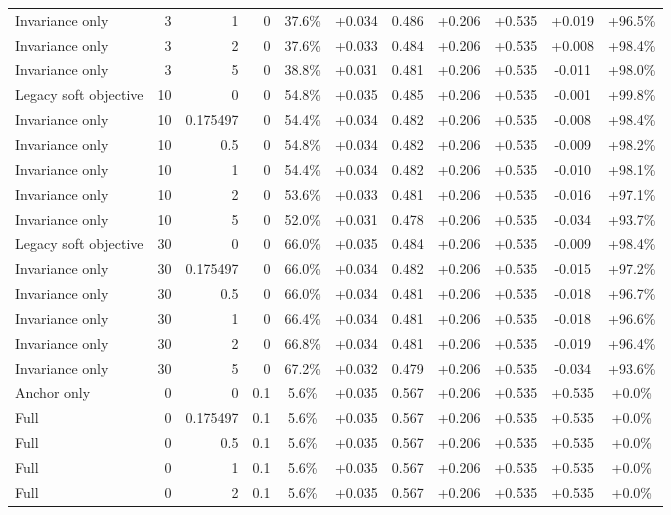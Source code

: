 \begin{table}[htbp]
\begin{tabular}{lrrrccccccc}
Invariance only & 3 & 1 & 0 & 37.6\% & +0.034 & 0.486 & +0.206 & +0.535 & +0.019 & +96.5\% \\
Invariance only & 3 & 2 & 0 & 37.6\% & +0.033 & 0.484 & +0.206 & +0.535 & +0.008 & +98.4\% \\
Invariance only & 3 & 5 & 0 & 38.8\% & +0.031 & 0.481 & +0.206 & +0.535 & -0.011 & +98.0\% \\
Legacy soft objective & 10 & 0 & 0 & 54.8\% & +0.035 & 0.485 & +0.206 & +0.535 & -0.001 & +99.8\% \\
Invariance only & 10 & 0.175497 & 0 & 54.4\% & +0.034 & 0.482 & +0.206 & +0.535 & -0.008 & +98.4\% \\
Invariance only & 10 & 0.5 & 0 & 54.8\% & +0.034 & 0.482 & +0.206 & +0.535 & -0.009 & +98.2\% \\
Invariance only & 10 & 1 & 0 & 54.4\% & +0.034 & 0.482 & +0.206 & +0.535 & -0.010 & +98.1\% \\
Invariance only & 10 & 2 & 0 & 53.6\% & +0.033 & 0.481 & +0.206 & +0.535 & -0.016 & +97.1\% \\
Invariance only & 10 & 5 & 0 & 52.0\% & +0.031 & 0.478 & +0.206 & +0.535 & -0.034 & +93.7\% \\
Legacy soft objective & 30 & 0 & 0 & 66.0\% & +0.035 & 0.484 & +0.206 & +0.535 & -0.009 & +98.4\% \\
Invariance only & 30 & 0.175497 & 0 & 66.0\% & +0.034 & 0.482 & +0.206 & +0.535 & -0.015 & +97.2\% \\
Invariance only & 30 & 0.5 & 0 & 66.0\% & +0.034 & 0.481 & +0.206 & +0.535 & -0.018 & +96.7\% \\
Invariance only & 30 & 1 & 0 & 66.4\% & +0.034 & 0.481 & +0.206 & +0.535 & -0.018 & +96.6\% \\
Invariance only & 30 & 2 & 0 & 66.8\% & +0.034 & 0.481 & +0.206 & +0.535 & -0.019 & +96.4\% \\
Invariance only & 30 & 5 & 0 & 67.2\% & +0.032 & 0.479 & +0.206 & +0.535 & -0.034 & +93.6\% \\
Anchor only & 0 & 0 & 0.1 & 5.6\% & +0.035 & 0.567 & +0.206 & +0.535 & +0.535 & +0.0\% \\
Full & 0 & 0.175497 & 0.1 & 5.6\% & +0.035 & 0.567 & +0.206 & +0.535 & +0.535 & +0.0\% \\
Full & 0 & 0.5 & 0.1 & 5.6\% & +0.035 & 0.567 & +0.206 & +0.535 & +0.535 & +0.0\% \\
Full & 0 & 1 & 0.1 & 5.6\% & +0.035 & 0.567 & +0.206 & +0.535 & +0.535 & +0.0\% \\
Full & 0 & 2 & 0.1 & 5.6\% & +0.035 & 0.567 & +0.206 & +0.535 & +0.535 & +0.0\% \\

\end{tabular}
\end{table}

